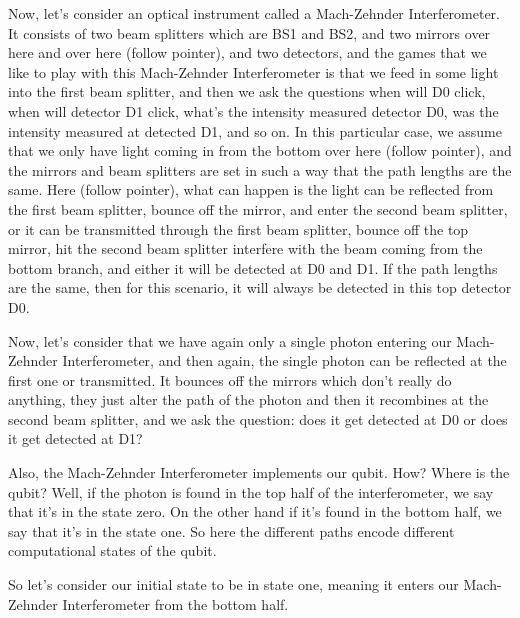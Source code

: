 Now, let's consider an optical instrument called a Mach-Zehnder Interferometer. It consists of two beam splitters which are BS1 and BS2, and two mirrors over here and over here (follow pointer), and two detectors, and the games that we like to play with this Mach-Zehnder Interferometer is that we feed in some light into the first beam splitter, and then we ask the questions when will D0 click, when will detector D1 click, what's the intensity measured detector D0, was the intensity measured at detected D1, and so on. In this particular case, we assume that we only have light coming in from the bottom over here (follow pointer), and the mirrors and beam splitters are set in such a way that the path lengths are the same. Here (follow pointer), what can happen is the light can be reflected from the first beam splitter, bounce off the mirror, and enter the second beam splitter, or it can be transmitted through the first beam splitter, bounce off the top mirror, hit the second beam splitter interfere with the beam coming from the bottom branch, and either it will be detected at D0 and D1. If the path lengths are the same, then for this scenario, it will always be detected in this top detector D0.

Now, let's consider that we have again only a single photon entering our Mach-Zehnder Interferometer, and then again, the single photon can be reflected at the first one or transmitted. It bounces off the mirrors which don't really do anything, they just alter the path of the photon and then it recombines at the second beam splitter, and we ask the question: does it get detected at D0 or does it get detected at D1?

Also, the Mach-Zehnder Interferometer implements our qubit. How? Where is the qubit? Well, if the photon is found in the top half of the interferometer, we say that it's in the state zero. On the other hand if it's found in the bottom half, we say that it's in the state one. So here the different paths encode different computational states of the qubit.

So let's consider our initial state to be in state one, meaning it enters our Mach-Zehnder Interferometer from the bottom half.

